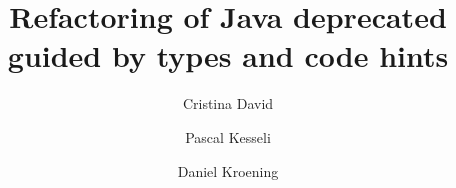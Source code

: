 \documentclass[sigconf,review,anonymous]{acmart}
\begin{document}




\title{Refactoring of Java deprecated guided by types and code hints}

\author{Cristina David}
\author{Pascal Kesseli}
\author{Daniel Kroening}






\end{document}
